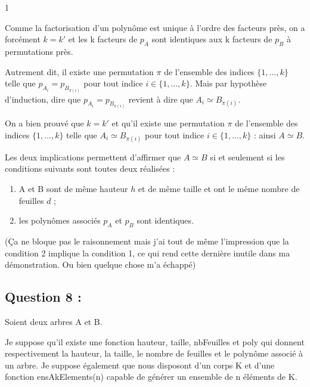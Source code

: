 1\documentclass[a4paper, 11pt,french]{article}
\begin{document}
\begin{itemize}
\begin{description}
    Comme la factorisation d'un polynôme est unique à l'ordre des facteurs près, on a forcément $k=k'$ et les k facteurs de $p_A$ sont identiques aux k facteurs de $p_B$ à permutations près.

    Autrement dit, il existe une permutation $\pi$ de l'ensemble des indices $\{1,\ldots,k\}$ telle que $p_{A_i}= p_{B_{\pi(i)}}$ pour tout indice $i\in\{1,\ldots,k\}$. Mais par hypothèse d'induction, dire que $p_{A_i}= p_{B_{\pi(i)}}$ revient à dire que $A_i\simeq B_{\pi(i)}$. 


    On a bien prouvé que $k=k'$ et qu'il existe une permutation $\pi$ de l'ensemble des indices $\{1,\ldots,k\}$ telle que ${A_i}\simeq {B_{\pi(i)}}$ pour tout indice $i\in\{1,\ldots,k\}$ : ainsi $A\simeq B$.
  \end{description}

  
\end{itemize}
Les deux implications permettent d'affirmer que $A\simeq B $ si et seulement si les conditions suivants sont toutes deux réalisées :
\begin{enumerate}
\item A et B sont de même hauteur $h$ et de même taille et ont le même nombre de feuilles $d$ ;
\item les polynômes associés $p_A$ et $p_B$ sont identiques.
\end{enumerate}

(Ça ne bloque pas le raisonnement mais j'ai tout de même l'impression que la condition 2 implique la condition 1, ce qui rend cette dernière inutile dans ma démonstration. Ou bien quelque chose m'a échappé)


\subsection*{Question 8 : }
Soient deux arbres A et B.

Je suppose qu'il existe une fonction hauteur, taille, nbFeuilles et poly qui donnent respectivement la hauteur, la taille, le nombre de feuilles et le polynôme associé à un arbre.
Je suppose également que nous disposont d'un corps K et d'une fonction ensAkElements(n) capable de générer un ensemble de n éléments de K.
\end{document}
